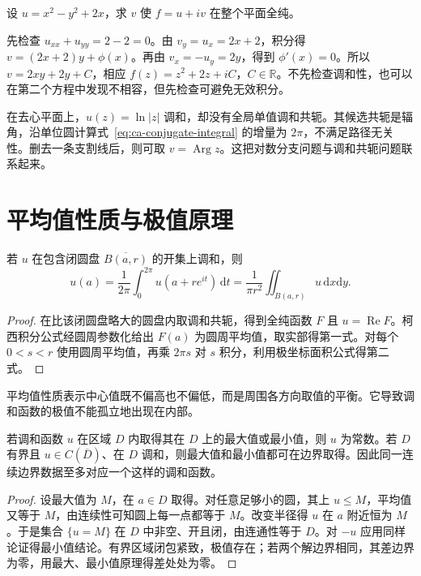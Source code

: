 \begin{example}[实际求调和共轭]
设 $u=x^2-y^2+2x$，求 $v$ 使 $f=u+iv$ 在整个平面全纯。
\end{example}
\begin{solve}
先检查 $u_{xx}+u_{yy}=2-2=0$。由 $v_y=u_x=2x+2$，积分得 $v=(2x+2)y+\phi(x)$。再由 $v_x=-u_y=2y$，得到 $\phi'(x)=0$。所以 $v=2xy+2y+C$，相应 $f(z)=z^2+2z+iC$，$C\in\mathbb R$。不先检查调和性，也可以在第二个方程中发现不相容，但先检查可避免无效积分。
\end{solve}

在去心平面上，$u(z)=\ln|z|$ 调和，却没有全局单值调和共轭。其候选共轭是辐角，沿单位圆计算式~\eqref{eq:ca-conjugate-integral} 的增量为 $2\pi$，不满足路径无关性。删去一条支割线后，则可取 $v=\operatorname{Arg}z$。这把对数分支问题与调和共轭问题联系起来。

\section{平均值性质与极值原理}

\begin{theorem}[平均值性质]
\label{thm:ca-harmonic-mean}
若 $u$ 在包含闭圆盘 $\overline{B(a,r)}$ 的开集上调和，则
\begin{equation}
 u(a)=\frac1{2\pi}\int_0^{2\pi}u(a+re^{it})\,\mathrm dt
 =\frac1{\pi r^2}\iint_{B(a,r)}u\,\mathrm dx\mathrm dy.
 \label{eq:ca-harmonic-mean}
\end{equation}
\end{theorem}
\begin{proof}
在比该闭圆盘略大的圆盘内取调和共轭，得到全纯函数 $F$ 且 $u=\operatorname{Re}F$。柯西积分公式经圆周参数化给出 $F(a)$ 为圆周平均值，取实部得第一式。对每个 $0<s<r$ 使用圆周平均值，再乘 $2\pi s$ 对 $s$ 积分，利用极坐标面积公式得第二式。
\end{proof}

平均值性质表示中心值既不偏高也不偏低，而是周围各方向取值的平衡。它导致调和函数的极值不能孤立地出现在内部。

\begin{theorem}
\label{thm:ca-harmonic-max}
若调和函数 $u$ 在区域 $D$ 内取得其在 $D$ 上的最大值或最小值，则 $u$ 为常数。若 $D$ 有界且 $u\in C(\overline D)$、在 $D$ 调和，则最大值和最小值都可在边界取得。因此同一连续边界数据至多对应一个这样的调和函数。
\end{theorem}
\begin{proof}
设最大值为 $M$，在 $a\in D$ 取得。对任意足够小的圆，其上 $u\le M$，平均值又等于 $M$，由连续性可知圆上每一点都等于 $M$。改变半径得 $u$ 在 $a$ 附近恒为 $M$。于是集合 $\{u=M\}$ 在 $D$ 中非空、开且闭，由连通性等于 $D$。对 $-u$ 应用同样论证得最小值结论。有界区域闭包紧致，极值存在；若两个解边界相同，其差边界为零，用最大、最小值原理得差处处为零。
\end{proof}

